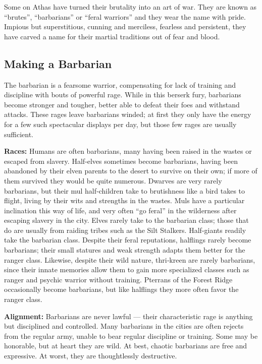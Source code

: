 \documentclass[10pt,a4paper,twocolumn]{d20}
\begin{document}
{Some on Athas have turned their brutality into an art of war. They are known as ``brutes'', ``barbarians'' or ``feral warriors'' and they wear the name with pride. Impious but superstitious, cunning and merciless, fearless and persistent, they have carved a name for their martial traditions out of fear and blood.

\subsection{Making a Barbarian}

The barbarian is a fearsome warrior, compensating for lack of training and discipline with bouts of powerful rage. While in this berserk fury, barbarians become stronger and tougher, better able to defeat their foes and withstand attacks. These rages leave barbarians winded; at first they only have the energy for a few such spectacular displays per day, but those few rages are usually sufficient.

\textbf{Races:} Humans are often barbarians, many having been raised in the wastes or escaped from slavery. Half‐elves sometimes become barbarians, having been abandoned by their elven parents to the desert to survive on their own; if more of them survived they would be quite numerous. Dwarves are very rarely barbarians, but their mul half‐children take to brutishness like a bird takes to flight, living by their wits and strengths in the wastes. Muls have a particular inclination this way of life, and very often ``go feral'' in the wilderness after escaping slavery in the city. Elves rarely take to the barbarian class; those that do are usually from raiding tribes such as the Silt Stalkers. Half‐giants readily take the barbarian class. Despite their feral reputations, halflings rarely become barbarians; their small statures and weak strength adapts them better for the ranger class. Likewise, despite their wild nature, thri‐kreen are rarely barbarians, since their innate memories allow them to gain more specialized classes such as ranger and psychic warrior without training. Pterrans of the Forest Ridge occasionally become barbarians, but like halflings they more often favor the ranger class.

\textbf{Alignment:} Barbarians are never lawful — their characteristic rage is anything but disciplined and controlled. Many barbarians in the cities are often rejects from the regular army, unable to bear regular discipline or training. Some may be honorable, but at heart they are wild. At best, chaotic barbarians are free and expressive. At worst, they are thoughtlessly destructive.

}
\end{document}
